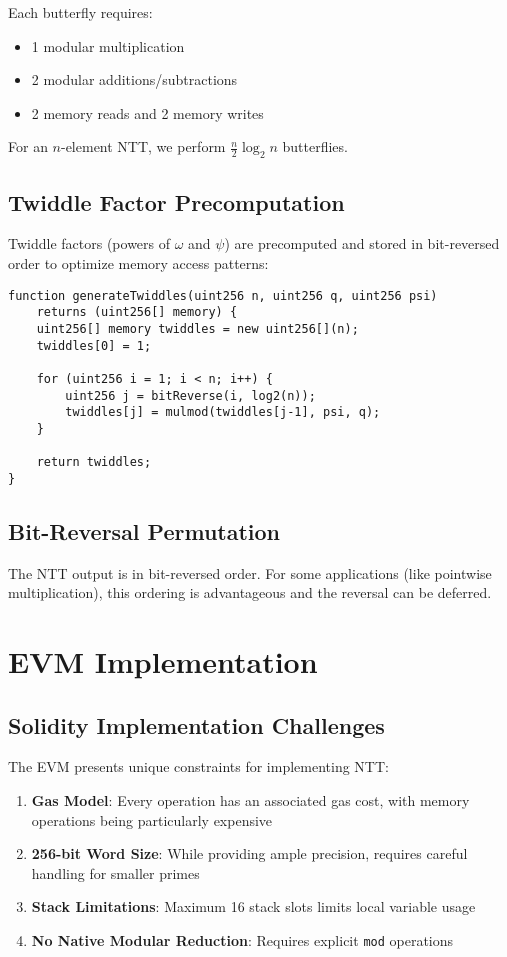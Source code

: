 \documentclass[11pt,a4paper]{article}
\begin{document}
Each butterfly requires:
\begin{itemize}
\item 1 modular multiplication
\item 2 modular additions/subtractions
\item 2 memory reads and 2 memory writes
\end{itemize}

For an $n$-element NTT, we perform $\frac{n}{2} \log_2 n$ butterflies.

\subsection{Twiddle Factor Precomputation}

Twiddle factors (powers of $\omega$ and $\psi$) are precomputed and stored in bit-reversed order to optimize memory access patterns:

\begin{lstlisting}[caption={Twiddle Factor Generation}]
function generateTwiddles(uint256 n, uint256 q, uint256 psi)
    returns (uint256[] memory) {
    uint256[] memory twiddles = new uint256[](n);
    twiddles[0] = 1;

    for (uint256 i = 1; i < n; i++) {
        uint256 j = bitReverse(i, log2(n));
        twiddles[j] = mulmod(twiddles[j-1], psi, q);
    }

    return twiddles;
}
\end{lstlisting}

\subsection{Bit-Reversal Permutation}

The NTT output is in bit-reversed order. For some applications (like pointwise multiplication), this ordering is advantageous and the reversal can be deferred.

\section{EVM Implementation}

\subsection{Solidity Implementation Challenges}

The EVM presents unique constraints for implementing NTT:

\begin{enumerate}
\item \textbf{Gas Model}: Every operation has an associated gas cost, with memory operations being particularly expensive
\item \textbf{256-bit Word Size}: While providing ample precision, requires careful handling for smaller primes
\item \textbf{Stack Limitations}: Maximum 16 stack slots limits local variable usage
\item \textbf{No Native Modular Reduction}: Requires explicit \texttt{mod} operations
\end{enumerate}
\end{document}
